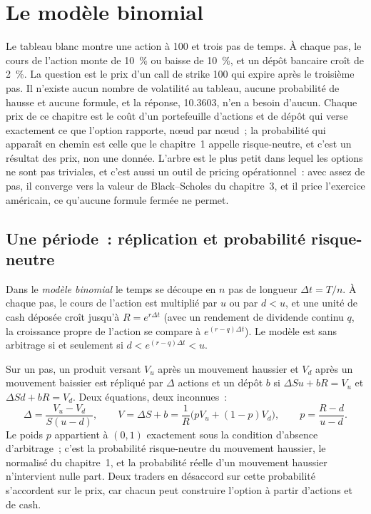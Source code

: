 \chapter{Le modèle binomial}\label{ch:dv:the-binomial-model}

Le tableau blanc montre une action à 100 et trois pas de temps. À chaque pas, le
cours de l'action monte de 10~\% ou baisse de 10~\%, et un dépôt bancaire croît de 2~\%. La question est le
prix d'un call de strike 100 qui expire après le troisième pas. Il n'existe
aucun nombre de volatilité au tableau, aucune probabilité de hausse et aucune formule,
et la réponse, 10.3603, n'en a besoin d'aucun. Chaque prix de ce chapitre est le
coût d'un portefeuille d'actions et de dépôt qui verse exactement ce que l'option
rapporte, nœud par nœud~; la probabilité qui apparaît en chemin est celle
que le chapitre~1 appelle risque-neutre, et c'est un résultat des prix, non une donnée.
L'arbre est le plus petit  dans lequel les options ne sont pas triviales,
et c'est aussi un outil de pricing opérationnel~: avec assez de pas, il converge vers la
valeur de Black--Scholes du chapitre~3, et il price l'exercice américain, ce
qu'aucune formule fermée ne permet.

\section{Une période~: réplication et probabilité risque-neutre}

\begin{definition}\label{def:dv:the-binomial-model:binomial}
Dans le \emph{modèle binomial} le temps se découpe en $n$ pas de
longueur $\Delta t=T/n$. À chaque pas, le cours de l'action est multiplié par $u$ ou par
$d<u$, et une unité de cash déposée croît jusqu'à $R=e^{r\Delta t}$ (avec un
rendement de dividende continu $q$, la croissance propre de l'action se compare à
$e^{(r-q)\Delta t}$). Le modèle est sans arbitrage si et seulement si
$d<e^{(r-q)\Delta t}<u$.
\end{definition}

Sur un pas, un produit versant $V_u$ après un mouvement haussier et $V_d$ après un
mouvement baissier est répliqué par $\Delta$ actions et un dépôt $b$ si $\Delta S u+bR=V_u$ et
$\Delta Sd+bR=V_d$. Deux équations, deux inconnues~:
\begin{equation}\label{eq:dv:the-binomial-model:onestep}
\Delta=\frac{V_u-V_d}{S(u-d)},\qquad
V=\Delta S+b=\frac{1}{R}\bigl(pV_u+(1-p)V_d\bigr),\qquad p=\frac{R-d}{u-d}.
\end{equation}
Le poids $p$ appartient à $(0,1)$ exactement sous la condition d'absence d'arbitrage~; c'est
la probabilité risque-neutre du mouvement haussier, le  normalisé du chapitre~1,
et la probabilité réelle d'un mouvement haussier n'intervient nulle part. Deux
traders en désaccord sur cette probabilité s'accordent sur le prix, car chacun peut
construire l'option à partir d'actions et de cash.

